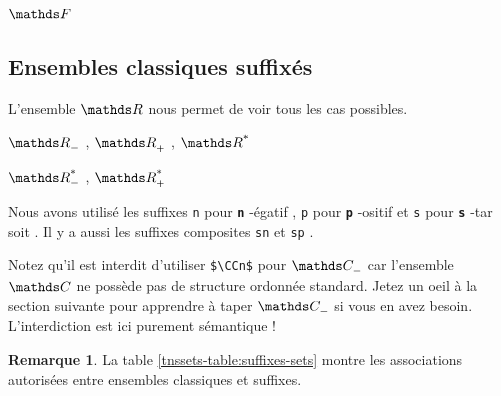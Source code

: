 \documentclass[12pt,a4paper]{book}
\makeatletter
\theoremstyle{definition}
\newtheorem*{remark}{Remarque}
\newcommand\whyprefix[2]{%
	\textbf{\prefix{#1}}-#2%
}
\newcommand\prefix[1]{%
	\texttt{#1}%
}
\newcommand\inenglish{\@ifstar{\@inenglish@star}{\@inenglish@no@star}}
\newcommand\@inenglish@star[1]{%
	\emph{\og #1 \fg}%
}
\newcommand\@inenglish@no@star[1]{%
	\@inenglish@star{#1} en anglais%
}
\makeatother
\begin{document}
{{\begin{latexex}
$\FF$
\end{latexex}




\subsection{Ensembles classiques suffixés}

L'ensemble $\RR$ nous permet de voir tous les cas possibles. 

\begin{latexex}
$\RRn$ , $\RRp$ , $\RRs$ 

$\RRsn$ , $\RRsp$
\end{latexex}


Nous avons utilisé les suffixes \prefix{n} pour \whyprefix{n}{égatif}, \prefix{p} pour \whyprefix{p}{ositif} et \prefix{s} pour \whyprefix{s}{tar} soit \inenglish{étoile}. Il y a aussi les suffixes composites \prefix{sn} et \prefix{sp}.

\medskip

Notez qu'il est interdit d'utiliser \verb+$\CCn$+ pour $\setspecial{\CC}{n}$ car l'ensemble $\CC$ ne possède pas de structure ordonnée standard. Jetez un oeil à la section suivante pour apprendre à taper $\setspecial{\CC}{n}$ si vous en avez besoin. L'interdiction est ici purement sémantique !

\medskip

\begin{remark}
	La table \ref{tnssets-table:suffixes-sets}  montre les associations autorisées entre ensembles classiques et suffixes.
\end{remark}


}}
\end{document}
